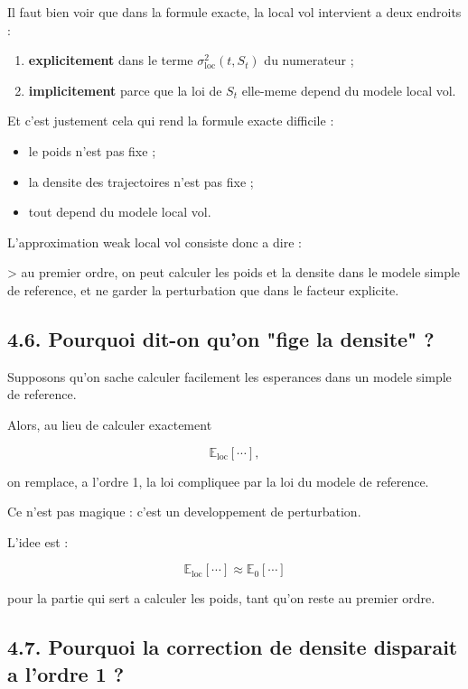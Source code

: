 \documentclass[11pt,a4paper]{article}
\begin{document}
Il faut bien voir que dans la formule exacte, la local vol intervient a deux endroits :

\begin{enumerate}
\item \textbf{explicitement} dans le terme \(\sigma_{\mathrm{loc}}^2(t,S_t)\) du numerateur ;
\item \textbf{implicitement} parce que la loi de \(S_t\) elle-meme depend du modele local vol.
\end{enumerate}

Et c'est justement cela qui rend la formule exacte difficile :

\begin{itemize}
\item le poids n'est pas fixe ;
\item la densite des trajectoires n'est pas fixe ;
\item tout depend du modele local vol.
\end{itemize}

L'approximation weak local vol consiste donc a dire :

> au premier ordre, on peut calculer les poids et la densite dans le modele simple de reference, et ne garder la perturbation que dans le facteur explicite.

\subsection{4.6. Pourquoi dit-on qu'on "fige la densite" ?}

Supposons qu'on sache calculer facilement les esperances dans un modele simple de reference.

Alors, au lieu de calculer exactement

\[
\mathbb E_{\mathrm{loc}}[\cdots],
\]

on remplace, a l'ordre 1, la loi compliquee par la loi du modele de reference.

Ce n'est pas magique : c'est un developpement de perturbation.

L'idee est :

\[
\mathbb E_{\mathrm{loc}}[\cdots]
\approx
\mathbb E_{0}[\cdots]
\]

pour la partie qui sert a calculer les poids, tant qu'on reste au premier ordre.

\subsection{4.7. Pourquoi la correction de densite disparait a l'ordre 1 ?}
\end{document}
